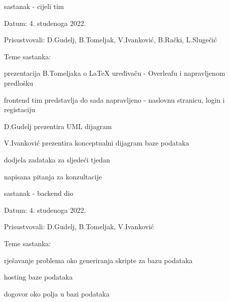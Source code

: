 \begin{packed_enum}
			\item  sastanak - cijeli tim
			\item[] \begin{packed_item}
				\item Datum: 4. studenoga 2022.
				\item Prisustvovali: D.Gudelj, B.Tomeljak, V.Ivanković, B.Rački, L.Slugečić
				\item Teme sastanka:
				\begin{packed_item}
					\item prezentacija B.Tomeljaka o LaTeX uređivaču - Overleafu i napravljenom predlošku
					\item frontend tim predstavlja do sada napravljeno - naslovnu stranicu, login i registaciju
					\item D.Gudelj prezentira UML dijagram
    				\item V.Ivanković prezentira konceptualni dijagram baze podataka
					\item dodjela zadataka za sljedeći tjedan
					\item napisana pitanja za konzultacije
				\end{packed_item}
			\end{packed_item}
			
			\item  sastanak - backend dio
			\item[] \begin{packed_item}
				\item Datum: 4. studenoga 2022.
				\item Prisustvovali: D.Gudelj, B.Tomeljak, V.Ivanković
				\item Teme sastanka:
				\begin{packed_item}
					\item rješavanje problema oko generiranja skripte za bazu podataka
					\item hosting baze podataka
					\item dogovor oko polja u bazi podataka
				\end{packed_item}
			\end{packed_item}
			

\end{packed_enum}
